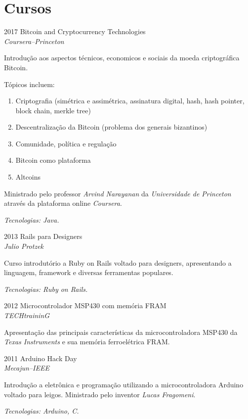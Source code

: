 \documentclass[a4paper]{simplecv}
\begin{document}
\section{Cursos}

\begin{topic}
\item[2017] Bitcoin and Cryptocurrency Technologies\\
	{\em\small Coursera--Princeton}

	Introdução aos aspectos técnicos, economicos e sociais da moeda
	criptográfica Bitcoin.

	Tópicos incluem:
	\begin{enumerate}
		\item Criptografia (simétrica e assimétrica, assinatura
			digital, hash, hash pointer, block chain, merkle tree)
		\item Descentralização da Bitcoin (problema dos generais
			bizantinos)
		\item Comunidade, política e regulação
		\item Bitcoin como plataforma
		\item Altcoins
	\end{enumerate}

	Ministrado pelo professor \emph{Arvind Narayanan} da
	\emph{Universidade de Princeton} através da plataforma online
	\emph{Coursera}.

	{\em\scriptsize Tecnologias: Java.}

\item[2013] Rails para Designers\\
	{\em\small Julio Protzek}

	Curso introdutório a Ruby on Rails voltado para designers, apresentando
	a linguagem, framework e diversas ferramentas populares.

	{\em\scriptsize Tecnologias: Ruby on Rails.}

\item[2012] Microcontrolador MSP430 com memória FRAM\\
	{\em\small TECHtraininG}

	Apresentação das principais características da microcontroladora MSP430
	da \emph{Texas Instruments} e sua memória ferroelétrica FRAM.

\item[2011] Arduino Hack Day\\
	{\em\small Mecajun--IEEE}

	Introdução a eletrônica e programação utilizando a microcontroladora
	Arduino voltado para leigos. Ministrado pelo inventor \emph{Lucas
	Fragomeni}.

	{\em\scriptsize Tecnologias: Arduino, C.}

\end{topic}
\end{document}

